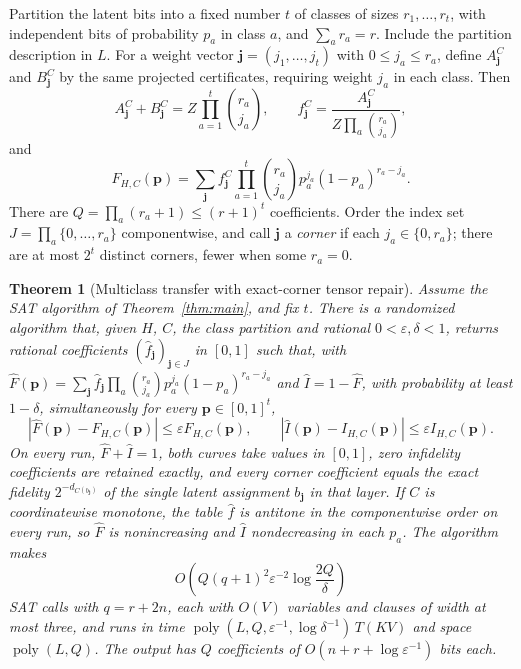\documentclass[11pt]{article}
\newtheorem{theorem}{Theorem}
\theoremstyle{remark}
\newcommand{\poly}{\operatorname{poly}}
\newcommand{\eps}{\varepsilon}
\begin{document}
Partition the latent bits into a fixed number \(t\) of classes
of sizes \(r_1,\ldots,r_t\), with independent bits of probability
\(p_a\) in class \(a\), and \(\sum_a r_a=r\).
Include the partition description in \(L\).
For a weight vector \(\mathbf j=(j_1,\ldots,j_t)\) with
\(0\le j_a\le r_a\), define \(A_{\mathbf j}^C\)
and \(B_{\mathbf j}^C\) by the same projected certificates,
requiring weight \(j_a\) in each class. Then
\[
 A_{\mathbf j}^C+B_{\mathbf j}^C
   =Z\prod_{a=1}^t\binom{r_a}{j_a},\qquad
 f_{\mathbf j}^C=
 \frac{A_{\mathbf j}^C}{Z\prod_a\binom{r_a}{j_a}},
\]
and
\[
 F_{H,C}(\mathbf p)=
 \sum_{\mathbf j} f_{\mathbf j}^C
 \prod_{a=1}^t\binom{r_a}{j_a}p_a^{j_a}(1-p_a)^{r_a-j_a}.
\]
There are \(Q=\prod_a(r_a+1)\le(r+1)^t\) coefficients. Order the index
set \(J=\prod_a\{0,\ldots,r_a\}\) componentwise, and call
\(\mathbf j\) a \emph{corner} if each \(j_a\in\{0,r_a\}\); there are at
most \(2^t\) distinct corners, fewer when some \(r_a=0\).

\begin{theorem}[Multiclass transfer with exact-corner tensor repair]
\label{thm:multiclass}
Assume the SAT algorithm of Theorem~\ref{thm:main}, and fix \(t\).
There is a randomized algorithm that, given \(H\), \(C\), the class
partition and rational \(0<\eps,\delta<1\), returns rational
coefficients \((\widehat f_{\mathbf j})_{\mathbf j\in J}\) in \([0,1]\)
such that, with
\(\widehat F(\mathbf p)=\sum_{\mathbf j}\widehat f_{\mathbf j}
 \prod_a\binom{r_a}{j_a}p_a^{j_a}(1-p_a)^{r_a-j_a}\)
and \(\widehat I=1-\widehat F\), with probability at least \(1-\delta\),
simultaneously for every \(\mathbf p\in[0,1]^t\),
\[
 |\widehat F(\mathbf p)-F_{H,C}(\mathbf p)|\le\eps F_{H,C}(\mathbf p),
 \qquad
 |\widehat I(\mathbf p)-I_{H,C}(\mathbf p)|\le\eps I_{H,C}(\mathbf p).
\]
On every run, \(\widehat F+\widehat I=1\), both curves take values in
\([0,1]\), zero infidelity coefficients are retained exactly, and every
corner coefficient equals the exact fidelity
\(2^{-d_{C(b_{\mathbf j})}}\) of the single latent assignment
\(b_{\mathbf j}\) in that layer. If \(C\) is coordinatewise monotone, the
table \(\widehat f\) is antitone in the componentwise order on every run,
so \(\widehat F\) is nonincreasing and \(\widehat I\) nondecreasing in
each \(p_a\).
The algorithm makes
\[
 O\!\left(Q(q+1)^2\eps^{-2}\log\frac{2Q}{\delta}\right)
\]
SAT calls with \(q=r+2n\), each with \(O(V)\) variables and clauses of
width at most three, and runs in time
\(\poly(L,Q,\eps^{-1},\log\delta^{-1})\,T(KV)\) and space
\(\poly(L,Q)\). The output has \(Q\) coefficients of
\(O(n+r+\log\eps^{-1})\) bits each.
\end{theorem}
\end{document}
